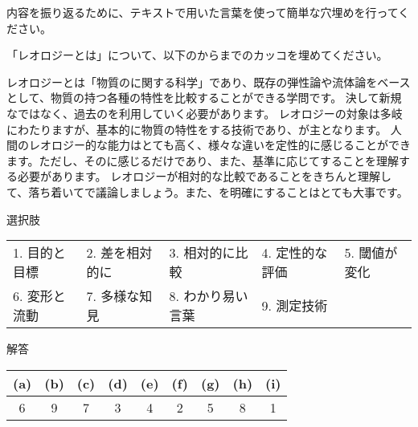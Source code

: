 \documentclass[uplatex,dvipdfmx,a4paper,11pt]{jsarticle}
\begin{document}
内容を振り返るために、テキストで用いた言葉を使って簡単な穴埋めを行ってください。

\begin{qparts}
    \qpart 「レオロジーとは」について、以下のからまでのカッコを埋めてください。
    \begin{qlist}
      \qitem レオロジーとは「物質の\qbox{}に関する科学」であり、既存の弾性論や流体論をベースとして、物質の持つ各種の特性を比較することができる学問です。
      決して新規な\qbox{}ではなく、過去の\qbox{}を利用していく必要があります。
      \qitem レオロジーの対象は多岐にわたりますが、基本的に物質の特性を\qbox{}する技術であり、\qbox{}が主となります。
      \qitem 人間のレオロジー的な能力はとても高く、様々な違いを定性的に感じることができます。ただし、その\qbox{}に感じるだけであり、また、基準に応じて\qbox{}することを理解する必要があります。
      \qitem レオロジーが相対的な比較であることをきちんと理解して、落ち着いて\qbox{}で議論しましょう。また、\qbox{}を明確にすることはとても大事です。
    \end{qlist}

    \begin{itembox}[l]{選択肢}
      \begin{center}
        \begin{tabular}{lllll}
                1. 目的と目標&2. 差を相対的に&3. 相対的に比較&4. 定性的な評価 & 5. 閾値が変化 \\
                6. 変形と流動&7. 多様な知見&8. わかり易い言葉 & 9. 測定技術
        \end{tabular}
      \end{center}
    \end{itembox}
\end{qparts}

\begin{itembox}[l]{解答}
        \begin{center} 
          \begin{tabular}{|c|c|c|c|c|c|c|c|c|} \hline
            (a) & (b) & (c) & (d) & (e) & (f) & (g) & (h) & (i)\\ \hline
            6  & 9 & 7 & 3 & 4 & 2 & 5 & 8 & 1 \\ \hline		
          \end{tabular}
        \end{center}
\end{itembox}
\end{document}

